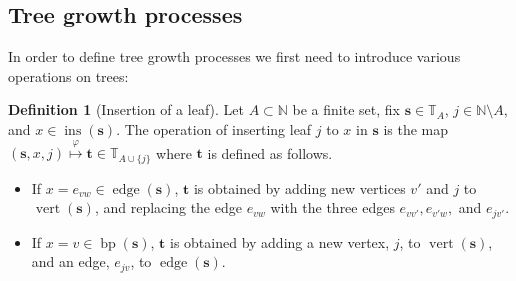 \documentclass[a4paper, final]{amsart}
\theoremstyle{plain}
\theoremstyle{definition}
\newtheorem{defi}[thm]{Definition}
\newcommand{\tree}[1][t]{\boldsymbol{#1}}
\newcommand{\T}{\mathbb{T}}
\DeclareMathOperator{\edge}{edge}
\DeclareMathOperator{\vertices}{vert}
\DeclareMathOperator{\insertable}{ins}
\DeclareMathOperator{\branchpoints}{bp}
\newcommand{\insertablef}[1][\tree]{\insertable({\tree[#1]})}
\newcommand{\N}{\mathbb{N}}
\begin{document}
\subsection{Tree growth processes}%
\label{sec:treegrowthprocesses}
%
In order to define tree growth processes we first need to introduce various operations on trees:
%
\begin{defi}[Insertion of a leaf]
  \label{def:insertion_nonplanar}
  Let $A \subset \N$ be a finite set, fix $\tree[s] \in \T_A$, $j \in \N \setminus A$, and $x \in \insertablef[s]$.
  The operation of inserting leaf $j$ to $x$ in $\tree[s]$ is the map $\left( \tree[s], x, j \right) \overset{\varphi}{\mapsto} \tree \in \T_{A \cup \{j\}}$ where $\tree$ is defined as follows.
  \begin{itemize}
    \item If $x = e_{vw} \in \edge(\tree[s])$, $\tree$ is obtained by adding new vertices $v'$ and $j$ to  $\vertices ( \tree[s] )$, and replacing the edge $e_{vw}$ with the three edges $e_{vv'}, e_{v'w},$ and $e_{jv'}$.
    \item If $x = v \in \branchpoints( \tree[s] )$, $\tree$ is obtained by adding a new vertex, $j$, to $\vertices ( \tree[s] )$, and an edge, $e_{jv}$, to $\edge ( \tree[s] )$.
  \end{itemize}
\end{defi}
%
\end{document}
